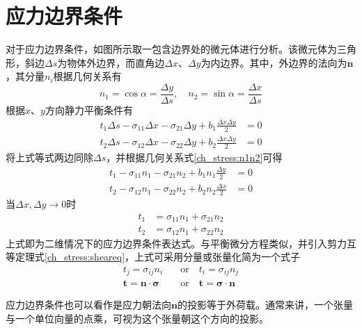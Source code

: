 \section{应力边界条件}
对于应力边界条件，如图所示取一包含边界处的微元体进行分析。该微元体为三角形，斜边$\Delta s$为物体外边界，而直角边$\Delta x$、$\Delta y$为内边界。其中，外边界的法向为$\boldsymbol n$，其分量$n_i$根据几何关系有
\begin{equation}\label{ch_stress:n1n2}
n_1 = \cos \alpha = \frac{\Delta y}{\Delta s}, \quad n_2 = \sin \alpha = \frac{\Delta x}{\Delta s}
\end{equation}
根据$x$、$y$方向静力平衡条件有
\begin{subequations}\label{ch_stress:eqbct}
    \begin{align}
        t_1 \Delta s - \sigma_{11} \Delta x - \sigma_{21} \Delta y + b_1 \frac{\Delta x \Delta y}{2} &= 0 \\
        t_2 \Delta s - \sigma_{12} \Delta x - \sigma_{22} \Delta y + b_2 \frac{\Delta x \Delta y}{2} &= 0
    \end{align}
\end{subequations}
将上式等式两边同除$\Delta s$，并根据几何关系式\eqref{ch_stress:n1n2}可得
\begin{subequations}\label{ch_stress:eqbct2}
    \begin{align}
        t_1 - \sigma_{11} n_1 - \sigma_{21} n_2 + b_1 n_1 \frac{\Delta y}{2} &= 0 \\
        t_2 - \sigma_{12} n_1 - \sigma_{22} n_2 + b_2 n_2 \frac{\Delta x}{2} &= 0
    \end{align}
\end{subequations}
当$\Delta x, \Delta y \rightarrow 0$时
\begin{subequations}
    \begin{align}
        t_1 &= \sigma_{11} n_1 + \sigma_{21} n_2 \\
        t_2 &= \sigma_{12} n_1 + \sigma_{22} n_2
    \end{align}
\end{subequations}
上式即为二维情况下的应力边界条件表达式。与平衡微分方程类似，并引入剪力互等定理式\eqref{ch_stress:sheareq}，上式可采用分量或张量化简为一个式子
\begin{subequations}
    \begin{align}
        t_j = \sigma_{ij} n_i \quad &\mathrm{or} \quad t_i = \sigma_{ij} n_j \\
        \boldsymbol t = \boldsymbol n \cdot \boldsymbol \sigma \quad &\mathrm{or} \quad \boldsymbol t = \boldsymbol \sigma \cdot \boldsymbol n
    \end{align}
\end{subequations}\par
应力边界条件也可以看作是应力朝法向$\boldsymbol n$的投影等于外荷载。通常来讲，一个张量与一个单位向量的点乘，可视为这个张量朝这个方向的投影。

